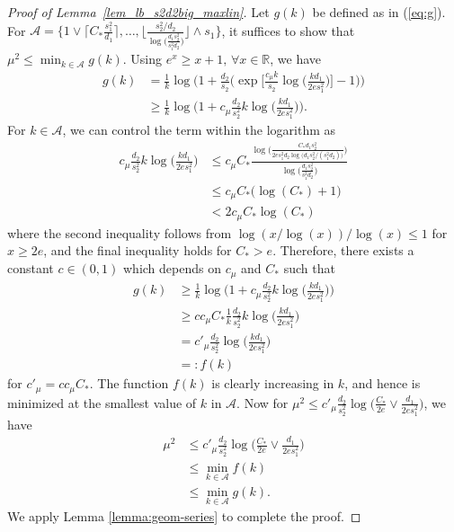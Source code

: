 \documentclass{article}
\newcommand{\R}{\mathbb{R}}
\newcommand{\cA}{\mathcal{A}}
\newcommand{\Ct}{C_{*}}
\theoremstyle{remark}
\begin{document}
\begin{proof}[Proof of Lemma~\ref{lem_lb_s2d2big_maxlin}]
    Let $g(k)$ be defined as in (\ref{eq:g}). For $\cA = \{1 \vee \lceil \Ct \frac{s_1^2}{d_1}\rceil, \dots ,  \Big\lfloor \frac{s_2^2/d_2}{\log\big(\frac{d_1s_2^2}{s_1^2d_2}\big)}\Big\rfloor\wedge s_1\}$, it suffices to show that $\mu^2 \leq \min_{k\in\cA}g(k)$. Using $e^x \geq x + 1,\, \forall x \in \R$, we have 
    \begin{align*}
        g(k) &= \frac{1}{k}\log\Bigg(1 + \frac{d_2}{s_2}\bigg(\exp\Big[\frac{c_\mu k}{s_2}\log\big(\frac{kd_1}{2es_1^2}\big)\Big] - 1\bigg)\Bigg) \\
        &\geq \frac{1}{k}\log\Bigg(1 + c_\mu\frac{d_2}{s^2_2}k\log\Big(\frac{kd_1}{2es_1^2}\Big)\Bigg).
    \end{align*}
    For $k \in \cA$,  we can control the term within the logarithm as
    \begin{align*}
        c_\mu\frac{d_2}{s^2_2}k\log\Big(\frac{kd_1}{2es_1^2}\Big) 
        &\leq c_\mu \Ct \frac{\log\Big(\frac{\Ct d_1s_2^2}{2es_1^2d_2\log\big(d_1s_2^2/(s_1^2d_2)\big)} \Big)}{\log\big(\frac{d_1s_2^2}{s_1^2d_2}\big)} \\
        &\leq c_\mu\Ct \big(\log (\Ct) + 1 \big) \\
        &< 2c_\mu\Ct \log (\Ct)
    \end{align*}
    where the second inequality follows from $\log(x/\log(x))/\log(x) \leq 1$ for $x \geq 2e$, and the final inequality holds for $\Ct > e$. Therefore, there exists a constant $c \in (0,1)$ which depends on $c_\mu$ and $\Ct$ such that 
    \begin{align*}
        g(k) &\geq \frac{1}{k}\log\Bigg(1 + c_\mu\frac{d_2}{s^2_2}k\log\Big(\frac{kd_1}{2es_1^2}\Big)\Bigg) \\
        &\geq cc_\mu \Ct \frac1k\frac{d_2}{s_2^2}k\log\big(\frac{kd_1}{2es_1^2}\big) \\
        &= c'_\mu\frac{d_2}{s_2^2}\log\big(\frac{kd_1}{2es_1^2}\big) \\
        &=: f(k)
    \end{align*}
    for $c'_\mu = c c_\mu \Ct$. The function $f(k)$ is clearly increasing in $k$, and hence is minimized at the smallest value of $k$ in $\cA$. 
    Now for $\mu^2 \leq c'_\mu \frac{d_2}{s_2^2}\log\big(\frac{\Ct}{2e}\vee \frac{d_1}{2es^2_1}\big)$, we have
    \begin{align*}
        \mu^2 &\leq c'_\mu \frac{d_2}{s_2^2}\log\big(\frac{\Ct}{2e}\vee \frac{d_1}{2es^2_1}\big) \\
        &\leq \min_{k \in \cA}f(k) \\
        &\leq \min_{k \in \cA}g(k).
    \end{align*}
    We apply Lemma \ref{lemma:geom-series} to complete the proof.
\end{proof}
\end{document}
